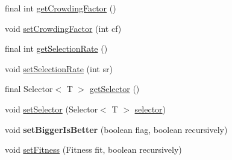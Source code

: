 \begin{CompactItemize}
final int \hyperlink{classjenes_1_1stage_1_1operator_1_1common_1_1_de_jong_crowder_3_01_t_01extends_01_chromosome_01_4_f34ed99b72eedd09864a9c447179b04e}{getCrowdingFactor} ()
\item 
void \hyperlink{classjenes_1_1stage_1_1operator_1_1common_1_1_de_jong_crowder_3_01_t_01extends_01_chromosome_01_4_3420256f796449f9f486e6dc85c52f0d}{setCrowdingFactor} (int cf)
\item 
final int \hyperlink{classjenes_1_1stage_1_1operator_1_1common_1_1_de_jong_crowder_3_01_t_01extends_01_chromosome_01_4_eae8a98bdc6da2261e6071ca62c5a066}{getSelectionRate} ()
\item 
void \hyperlink{classjenes_1_1stage_1_1operator_1_1common_1_1_de_jong_crowder_3_01_t_01extends_01_chromosome_01_4_4d1a71c514bb8ffaeba9a13434dc3635}{setSelectionRate} (int sr)
\item 
final Selector$<$ T $>$ \hyperlink{classjenes_1_1stage_1_1operator_1_1common_1_1_de_jong_crowder_3_01_t_01extends_01_chromosome_01_4_c407367e2e9ecad45bab4253ca920a1a}{getSelector} ()
\item 
void \hyperlink{classjenes_1_1stage_1_1operator_1_1common_1_1_de_jong_crowder_3_01_t_01extends_01_chromosome_01_4_880fdcaa7ccc39a3f5512b4bd58e74ad}{setSelector} (Selector$<$ T $>$ \hyperlink{classjenes_1_1stage_1_1operator_1_1common_1_1_de_jong_crowder_3_01_t_01extends_01_chromosome_01_4_6486b0225d345afd81b86dd04772d5ba}{selector})
\item 
\hypertarget{classjenes_1_1stage_1_1operator_1_1common_1_1_de_jong_crowder_3_01_t_01extends_01_chromosome_01_4_75bf0d077c6bff093600f1f4c333d3d1}{
void \textbf{setBiggerIsBetter} (boolean flag, boolean recursively)}
\label{classjenes_1_1stage_1_1operator_1_1common_1_1_de_jong_crowder_3_01_t_01extends_01_chromosome_01_4_75bf0d077c6bff093600f1f4c333d3d1}

\item 
void \hyperlink{classjenes_1_1stage_1_1operator_1_1common_1_1_de_jong_crowder_3_01_t_01extends_01_chromosome_01_4_856473a5ced464b1923545059c9f2e67}{setFitness} (Fitness fit, boolean recursively)
\end{CompactItemize}
